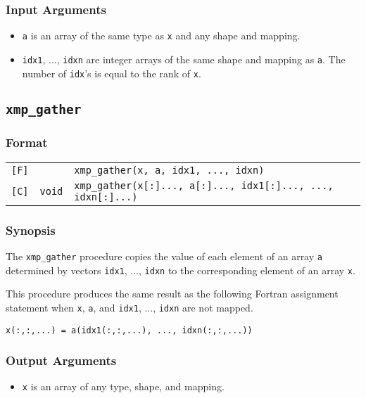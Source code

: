 \subsubsection*{Input Arguments}
\begin{itemize}
 \item {\tt a} is an array of the same type as {\tt x} and any shape
       and mapping.
 \item {\tt idx1}, ..., {\tt idxn} are integer arrays of the same
       shape and mapping as {\tt a}. The number of {\tt idx}'s is
       equal to the rank of {\tt x}.
\end{itemize}


\subsection{\tt xmp\_gather}

\subsubsection*{Format}

\begin{tabular}{lll}

\verb![F]!&            & {\tt xmp\_gather(x, a, idx1, ..., idxn)}\\

\verb![C]!& {\tt void} & {\tt xmp\_gather(x[:]..., a[:]..., idx1[:]..., ..., idxn[:]...)}\\

\end{tabular}

\subsubsection*{Synopsis}

The {\tt xmp\_gather} procedure copies the value of each element of
an array {\tt a} determined by vectors {\tt idx1}, ..., {\tt idxn}
to the corresponding element of an array {\tt x}.

This procedure produces the same result as the following Fortran
assignment statement when {\tt x}, {\tt a}, and {\tt idx1}, ...,
{\tt idxn} are not mapped.

\begin{verbatim}
x(:,:,...) = a(idx1(:,:,...), ..., idxn(:,:,...))
\end{verbatim}

\subsubsection*{Output Arguments}
\begin{itemize}
 \item {\tt x} is an array of any type, shape, and mapping.
\end{itemize}

